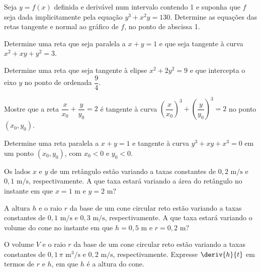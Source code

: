 \begin{exercicio}[4]
Seja $y = f(x)$ definida e derivável num intervalo contendo 1 e suponha que $f$ seja dada implicitamente pela equação $y^3 + x^2 y = 130$. Determine as equações das retas tangente e normal ao gráfico de $f$, no ponto de abscissa 1.
\end{exercicio}

\begin{exercicio}[5]
Determine uma reta que seja paralela a $x + y = 1$ e que seja tangente à curva $x^2 + xy + y^2 = 3$.
\end{exercicio}

\begin{exercicio}[6]
Determine uma reta que seja tangente à elipse $x^2 + 2y^2 = 9$ e que intercepta o eixo $y$ no ponto de ordenada $\dfrac{9}{4}$.
\end{exercicio}

\begin{exercicio}[7]
Mostre que a reta $\dfrac{x}{x_0} + \dfrac{y}{y_0} = 2$ é tangente à curva $\left(\dfrac{x}{x_0}\right)^{\!3} + \left(\dfrac{y}{y_0}\right)^{\!3} = 2$ no ponto $(x_0, y_0)$.
\end{exercicio}

\begin{exercicio}[8]
Determine uma reta paralela a $x + y = 1$ e tangente à curva $y^3 + xy + x^3 = 0$ em um ponto $(x_0, y_0)$, com $x_0 < 0$ e $y_0 < 0$.
\end{exercicio}

\begin{exercicio}[9]
Os lados $x$ e $y$ de um retângulo estão variando a taxas constantes de $0{,}2\text{ m/s}$ e $0{,}1\text{ m/s}$, respectivamente. A que taxa estará variando a área do retângulo no instante em que $x = 1\text{ m}$ e $y = 2\text{ m}$?
\end{exercicio}

\begin{exercicio}[10]
A altura $h$ e o raio $r$ da base de um cone circular reto estão variando a taxas constantes de $0{,}1\text{ m/s}$ e $0{,}3\text{ m/s}$, respectivamente. A que taxa estará variando o volume do cone no instante em que $h = 0{,}5\text{ m}$ e $r = 0{,}2\text{ m}$?
\end{exercicio}

\begin{exercicio}[11]
O volume $V$ e o raio $r$ da base de um cone circular reto estão variando a taxas constantes de $0{,}1\,\pi\text{ m}^3\text{/s}$ e $0{,}2\text{ m/s}$, respectivamente. Expresse $\deriv{h}{t}$ em termos de $r$ e $h$, em que $h$ é a altura do cone.
\end{exercicio}

